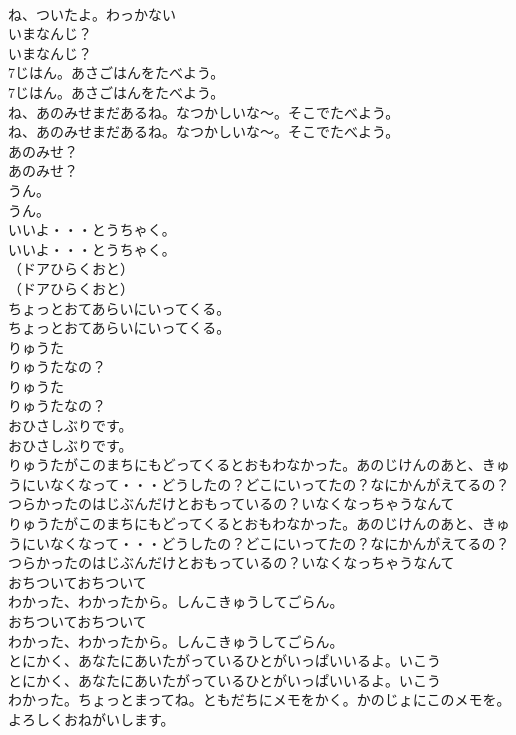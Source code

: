 \documentclass[8pt]{extreport}
\begin{document}
\begin{CJK}{UTF8}{min}
\\	ね、ついたよ。わっかない
\\	いまなんじ？
\\	いまなんじ？
\\	7じはん。あさごはんをたべよう。
\\	7じはん。あさごはんをたべよう。
\\	ね、あのみせまだあるね。なつかしいな～。そこでたべよう。
\\	ね、あのみせまだあるね。なつかしいな～。そこでたべよう。
\\	あのみせ？
\\	あのみせ？
\\	うん。
\\	うん。
\\	いいよ・・・とうちゃく。
\\	いいよ・・・とうちゃく。
\\	（ドアひらくおと）
\\	（ドアひらくおと）
\\	ちょっとおてあらいにいってくる。
\\	ちょっとおてあらいにいってくる。
\\	りゅうた
\\	りゅうたなの？
\\	りゅうた
\\	りゅうたなの？
\\	おひさしぶりです。
\\	おひさしぶりです。
\\	りゅうたがこのまちにもどってくるとおもわなかった。あのじけんのあと、きゅうにいなくなって・・・どうしたの？どこにいってたの？なにかんがえてるの？つらかったのはじぶんだけとおもっているの？いなくなっちゃうなんて
\\	りゅうたがこのまちにもどってくるとおもわなかった。あのじけんのあと、きゅうにいなくなって・・・どうしたの？どこにいってたの？なにかんがえてるの？つらかったのはじぶんだけとおもっているの？いなくなっちゃうなんて
\\	おちついておちついて
\\	わかった、わかったから。しんこきゅうしてごらん。
\\	おちついておちついて
\\	わかった、わかったから。しんこきゅうしてごらん。
\\	とにかく、あなたにあいたがっているひとがいっぱいいるよ。いこう
\\	とにかく、あなたにあいたがっているひとがいっぱいいるよ。いこう
\\	わかった。ちょっとまってね。ともだちにメモをかく。かのじょにこのメモを。よろしくおねがいします。

\end{CJK}
\end{document}
